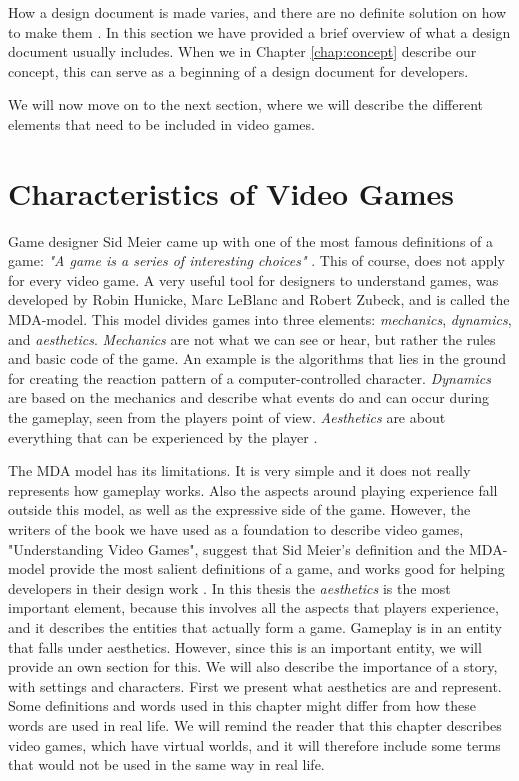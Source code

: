 How a design document is made varies, and there are no definite solution on how to make them \cite{gamedesign}. In this section we have provided a brief overview of what a design document usually includes. When we in Chapter \ref{chap:concept} describe our concept, this can serve as a beginning of a design document for developers.

We will now move on to the next section, where we will describe the different elements that need to be included in video games.

\section{Characteristics of Video Games}
\label{sec:videogametheory}

Game designer Sid Meier came up with one of the most famous definitions of a game: \emph{"A game is a series of interesting choices"} \cite{understandingvg}. This of course, does not apply for every video game. A very useful tool for designers to understand games, was developed by Robin Hunicke, Marc LeBlanc and Robert Zubeck, and is called the MDA-model. This model divides games into three elements: \emph{mechanics}, \emph{dynamics}, and \emph{aesthetics}. \emph{Mechanics} are not what we can see or hear, but rather the rules and basic code of the game. An example is the algorithms that lies in the ground for creating the reaction pattern of a computer-controlled character. \emph{Dynamics} are based on the mechanics and describe what events do and can occur during the gameplay, seen from the players point of view. \emph{Aesthetics} are about everything that can be experienced by the player \cite{understandingvg}. 

The MDA model has its limitations. It is very simple and it does not really represents how gameplay works. Also the aspects around playing experience fall outside this model, as well as the expressive side of the game. However, the writers of the book we have used as a foundation to describe video games, "Understanding Video Games", suggest that Sid Meier's definition and the MDA-model provide the most salient definitions of a game, and works good for helping developers in their design work \cite{understandingvg}. In this thesis the \emph{aesthetics} is the most important element, because this involves all the aspects that players experience, and it describes the entities that actually form a game. Gameplay is in \cite{understandingvg} an entity that falls under aesthetics. However, since this is an important entity, we will provide an own section for this. We will also describe the importance of a story, with settings and characters. First we present what aesthetics are and represent. Some definitions and words used in this chapter might differ from how these words are used in real life. We will remind the reader that this chapter describes video games, which have virtual worlds, and it will therefore include some terms that would not be used in the same way in real life.    



